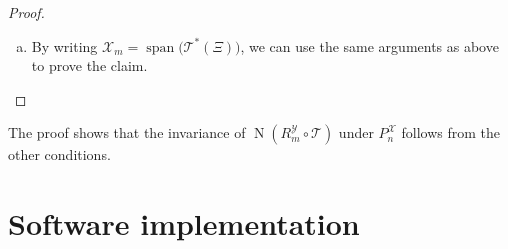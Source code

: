 \documentclass[a4paper]{paper}
\newcommand*{\SPC}[1]{{\ensuremath{\mathscr{#1}}}}
\newcommand*{\SPCX}{\SPC{X}}
\newcommand*{\OP}[1]{{\ensuremath{\mathcal{#1}}}}
\newcommand*{\OPT}{\OP{T}}
\newcommand*{\REST}[2]{\ensuremath{R_{#1}^{#2}}}
\newcommand*{\PROJ}[2]{\ensuremath{P_{#1}^{#2}}}
\newcommand*{\RmY}{{\ensuremath{\REST{m}{\SPC{Y}}}}}
\newcommand*{\PnX}{{\ensuremath{\PROJ{n}{\SPCX}}}}
\DeclareMathOperator{\NULL}{N}
\DeclareMathOperator{\SPAN}{span}
\begin{document}
\begin{proof}
\begin{enumerate}[(a)]
  \item By writing $\SPCX_m = \SPAN\big( \OPT^*(\Xi) \big)$, we can use the same arguments as above to prove the claim.
 \end{enumerate}
\end{proof}


\begin{remark}
 The proof shows that the invariance of $\NULL(\RmY \circ \OPT)$ under $\PnX$ follows from the other conditions.
\end{remark}


\section{Software implementation}
\label{sec:soft}
\end{document}
